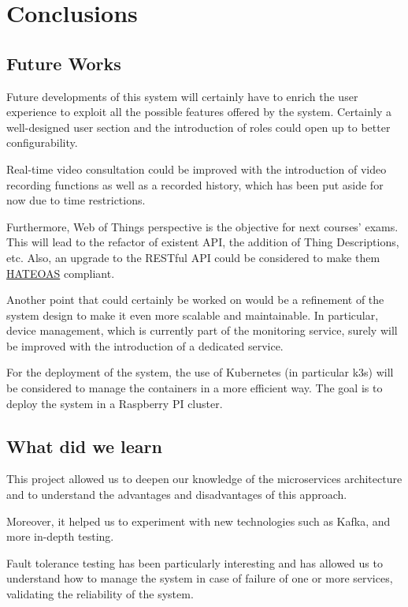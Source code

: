 \documentclass{scrartcl}
\begin{document}
    \section{Conclusions}

    \subsection{Future Works}

    Future developments of this system will certainly have to enrich the user experience to exploit all the possible features offered by the system.
    Certainly a well-designed user section and the introduction of roles could open up to better configurability.

    Real-time video consultation could be improved with the introduction of video recording functions as well as a recorded history,
    which has been put aside for now due to time restrictions.

    Furthermore, Web of Things perspective is the objective for next courses' exams.
    This will lead to the refactor of existent API, the addition of Thing Descriptions, etc.
    Also, an upgrade to the RESTful API could be considered to make them \href{https://en.wikipedia.org/wiki/HATEOAS}{HATEOAS} compliant.

    Another point that could certainly be worked on would be a refinement of the system design to make it even more scalable and maintainable.
    In particular, device management, which is currently part of the monitoring service, surely will be improved with the introduction of a dedicated service.

    For the deployment of the system, the use of Kubernetes (in particular k3s) will be considered to manage the containers in a more efficient way.
    The goal is to deploy the system in a Raspberry PI cluster.

    \subsection{What did we learn}

    This project allowed us to deepen our knowledge of the microservices architecture and to understand the advantages and disadvantages of this approach.

    Moreover, it helped us to experiment with new technologies such as Kafka, and more in-depth testing.

    Fault tolerance testing has been particularly interesting and has allowed us to understand how to manage the system in case of failure of one or more services, validating the reliability of the system.

%    
\end{document}
